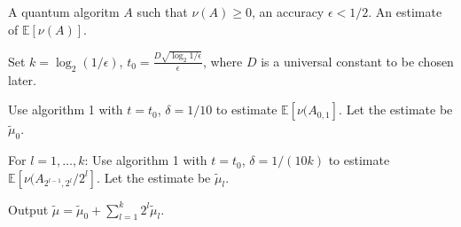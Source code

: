 \documentclass{article}
\begin{document}
\pagestyle{empty} 

\begin{algorithm}[ht]
	\caption{} 
	\begin{algorithmic}[1]

		\Require  A quantum algoritm $A$ such that $\nu(A) \geq 0$, an accuracy $\epsilon< 1/2$. 
		\Ensure An estimate of $\mathbb{E}[\nu(A)]$.
		\vspace{10pt}
		\Statex 
		
		\State Set $k = \log_2(1/\epsilon)$, $t_0 =\frac{D\sqrt{\log_2{1/\epsilon}}}{\epsilon}$, where $D$ is a universal constant to be chosen later.
		
		\State Use algorithm 1 with $t=t_0$, $\delta = 1/10$ to estimate $\mathbb{E}[\nu(A_{0,1}]$. Let the estimate be $\widetilde{\mu}_0$.
		
		\State For $l = 1,\dots, k$:
		 Use algorithm 1 with $t=t_0$, $\delta = 1/(10k)$ to estimate $\mathbb{E}[\nu(A_{2^{l-1},2^l}/2^l]$. Let the estimate be $\widetilde{\mu}_l$.
		 
		\State Output $\widetilde{\mu} = \widetilde{\mu}_0 + \sum_{l=1}^k 2^l \widetilde{\mu}_l$.
		
		
	\end{algorithmic}
\end{algorithm}
\end{document}
